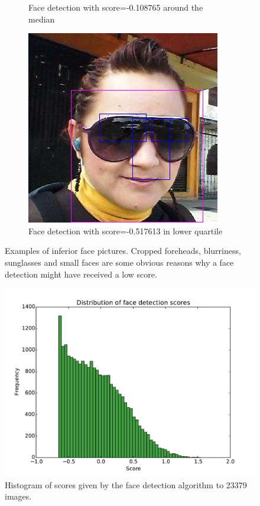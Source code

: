 \begin{figure}
\begin{subfigure}[t]{0.3\textwidth}
      \caption{Face detection with score=-0.108765 around the median}
      \label{fig:results:fd:median_detected1}
    \end{subfigure}
    \begin{subfigure}[t]{0.3\textwidth}
      \includegraphics[width=\textwidth]{figures/results/detected_q1_f1c5f486-1697-4089-9bb6-7962d7db630c}
      \caption{Face detection with score=-0.517613 in lower quartile}
      \label{fig:results:fd:q1_detected3}
    \end{subfigure}
\caption{Examples of inferior face pictures. Cropped foreheads, blurriness, sunglasses and small faces are some obvious reasons why a face detection might have received a low score.}
\label{fig:results:fd:other_detected}
\end{figure}

\begin{figure}
    \includegraphics[width=\textwidth]{figures/results/scores_hist}
    \caption{Histogram of scores given by the face detection algorithm to 23379 images.}
    \label{fig:results:fd:scores_hist}
\end{figure}

